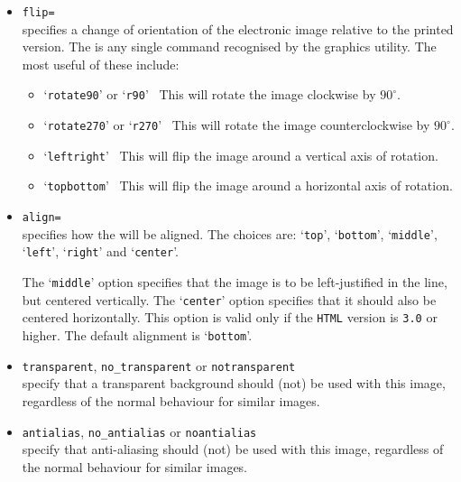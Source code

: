\begin{itemize}
\item \texttt{flip=}\\
specifies a change of orientation of the
electronic image relative to the printed version.
The  is any single command recognised by
the  graphics utility.
The most useful of these include:
\begin{itemize}
%
\item `\texttt{rotate90}' or `\texttt{r90}'~
This will rotate the image clockwise by $90^\circ$.
%
\item `\texttt{rotate270}' or `\texttt{r270}'~
This will rotate the image counterclockwise by $90^\circ$.
%
\item `\texttt{leftright}'~ 
This will flip the image around a vertical axis of rotation.
%
\item `\texttt{topbottom}'~
This will flip the image around a horizontal axis of rotation.
\end{itemize}
%
%
%
\item \texttt{align=}\\
specifies how the  will be aligned.  
The choices are:  
`\texttt{top}', `\texttt{bottom}', `\texttt{middle}', `\texttt{left}', 
`\texttt{right}' and `\texttt{center}'.

The `\texttt{middle}' option specifies that the image is to be
left-justified in the line, but centered vertically.  
The `\texttt{center}' option specifies that it should also 
be centered horizontally. 
This option is valid only if the \texttt{HTML} version 
is \texttt{3.0} or higher.
The default alignment is `\texttt{bottom}'.%

%
%
%
\item \texttt{transparent}, \texttt{no\_transparent}
 or \texttt{notransparent}\\
specify that a transparent background should (not) be used with this image,
regardless of the normal behaviour for similar images.

%
%
\item \texttt{antialias}, \texttt{no\_antialias}
 or \texttt{noantialias}\\
specify that anti-aliasing should (not) be used with this image,
regardless of the normal behaviour for similar images.


\end{itemize}
